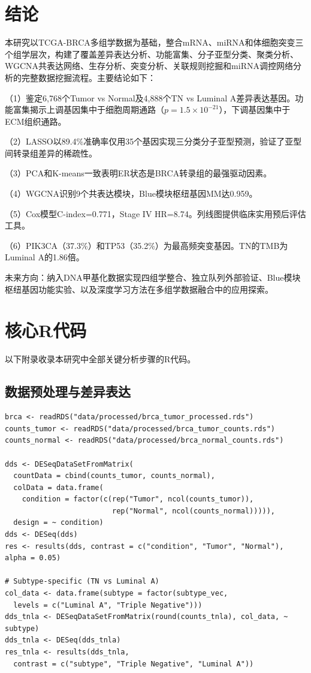 \documentclass[12pt,a4paper]{ctexart}
\begin{document}
\section{结论}

本研究以TCGA-BRCA多组学数据为基础，整合mRNA、miRNA和体细胞突变三个组学层次，构建了覆盖差异表达分析、功能富集、分子亚型分类、聚类分析、WGCNA共表达网络、生存分析、突变分析、关联规则挖掘和miRNA调控网络分析的完整数据挖掘流程。主要结论如下：

（1）鉴定6,768个Tumor vs Normal及4,888个TN vs Luminal A差异表达基因。功能富集揭示上调基因集中于细胞周期通路（$p=1.5\times10^{-21}$），下调基因集中于ECM组织通路。

（2）LASSO以89.4\%准确率仅用35个基因实现三分类分子亚型预测，验证了亚型间转录组差异的稀疏性。

（3）PCA和K-means一致表明ER状态是BRCA转录组的最强驱动因素。

（4）WGCNA识别9个共表达模块，Blue模块枢纽基因MM达0.959。

（5）Cox模型C-index=0.771，Stage IV HR=8.74。列线图提供临床实用预后评估工具。

（6）PIK3CA（37.3\%）和TP53（35.2\%）为最高频突变基因。TN的TMB为Luminal A的1.86倍。

未来方向：纳入DNA甲基化数据实现四组学整合、独立队列外部验证、Blue模块枢纽基因功能实验、以及深度学习方法在多组学数据融合中的应用探索。

\printbibliography

\newpage
\appendix
\section{核心R代码}

以下附录收录本研究中全部关键分析步骤的R代码。

\subsection{数据预处理与差异表达}

\begin{lstlisting}[caption={mRNA数据预处理与DESeq2差异表达}]
brca <- readRDS("data/processed/brca_tumor_processed.rds")
counts_tumor <- readRDS("data/processed/brca_tumor_counts.rds")
counts_normal <- readRDS("data/processed/brca_normal_counts.rds")

dds <- DESeqDataSetFromMatrix(
  countData = cbind(counts_tumor, counts_normal),
  colData = data.frame(
    condition = factor(c(rep("Tumor", ncol(counts_tumor)),
                         rep("Normal", ncol(counts_normal))))),
  design = ~ condition)
dds <- DESeq(dds)
res <- results(dds, contrast = c("condition", "Tumor", "Normal"), alpha = 0.05)

# Subtype-specific (TN vs Luminal A)
col_data <- data.frame(subtype = factor(subtype_vec,
  levels = c("Luminal A", "Triple Negative")))
dds_tnla <- DESeqDataSetFromMatrix(round(counts_tnla), col_data, ~ subtype)
dds_tnla <- DESeq(dds_tnla)
res_tnla <- results(dds_tnla,
  contrast = c("subtype", "Triple Negative", "Luminal A"))
\end{lstlisting}
\end{document}
